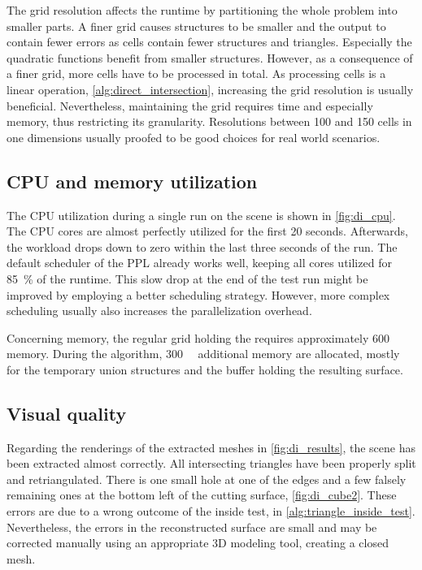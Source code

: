 The grid resolution affects the runtime by partitioning the whole problem into smaller parts.
A finer grid causes structures to be smaller and the output to contain fewer errors as cells contain fewer structures and triangles.
Especially the quadratic functions benefit from smaller structures.
However, as a consequence of a finer grid, more cells have to be processed in total.
As processing cells is a linear operation, \cf \cref{alg:direct_intersection}, increasing the grid resolution is usually beneficial.
Nevertheless, maintaining the grid requires time and especially memory, thus restricting its granularity.
Resolutions between 100 and 150 cells in one dimensions usually proofed to be good choices for real world scenarios.


\subsection{CPU and memory utilization}

The CPU utilization during a single run on the \impeller scene is shown in \cref{fig:di_cpu}.
The CPU cores are almost perfectly utilized for the first 20 seconds.
Afterwards, the workload drops down to zero within the last three seconds of the run.
The default scheduler of the PPL already works well, keeping all cores utilized for \SI{85}{\percent} of the runtime.
This slow drop at the end of the test run might be improved by employing a better scheduling strategy.
However, more complex scheduling usually also increases the parallelization overhead.

Concerning memory, the regular grid holding the \impeller requires approximately \SI{600}{\mebi\byte} memory.
During the algorithm, \SI{300}{\mebi\byte} additional memory are allocated, mostly for the temporary union structures and the buffer holding the resulting surface.


\subsection{Visual quality}

Regarding the renderings of the extracted meshes in \cref{fig:di_results}, the \cubes scene has been extracted almost correctly.
All intersecting triangles have been properly split and retriangulated.
There is one small hole at one of the edges and a few falsely remaining ones at the bottom left of the cutting surface, \cf \cref{fig:di_cube2}.
These errors are due to a wrong outcome of the inside test, \cf {} in \cref{alg:triangle_inside_test}.
Nevertheless, the errors in the reconstructed surface are small and may be corrected manually using an appropriate 3D modeling tool, creating a closed mesh.

